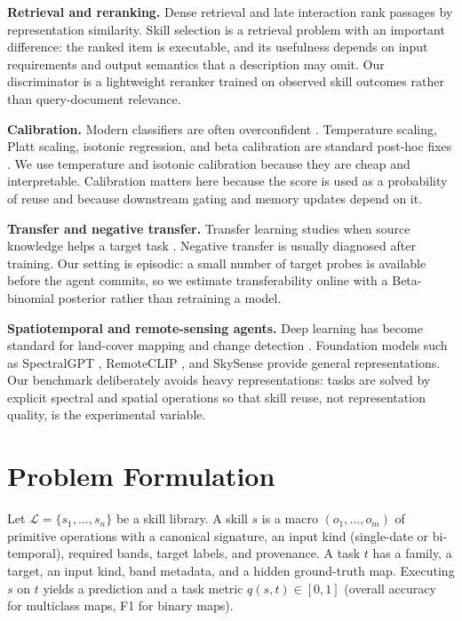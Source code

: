\documentclass[journal]{IEEEtran}
\begin{document}
\textbf{Retrieval and reranking.} Dense retrieval \cite{dpr,rag} and late interaction \cite{colbert} rank passages by representation similarity. Skill selection is a retrieval problem with an important difference: the ranked item is executable, and its usefulness depends on input requirements and output semantics that a description may omit. Our discriminator is a lightweight reranker trained on observed skill outcomes rather than query-document relevance.

\textbf{Calibration.} Modern classifiers are often overconfident \cite{guo}. Temperature scaling, Platt scaling, isotonic regression, and beta calibration are standard post-hoc fixes \cite{platt,zadrozny,niculescu,kull}. We use temperature and isotonic calibration because they are cheap and interpretable. Calibration matters here because the score is used as a probability of reuse and because downstream gating and memory updates depend on it.

\textbf{Transfer and negative transfer.} Transfer learning studies when source knowledge helps a target task \cite{pan,zhuang}. Negative transfer is usually diagnosed after training. Our setting is episodic: a small number of target probes is available before the agent commits, so we estimate transferability online with a Beta-binomial posterior rather than retraining a model.

\textbf{Spatiotemporal and remote-sensing agents.} Deep learning has become standard for land-cover mapping and change detection \cite{zhu,ma,chencd}. Foundation models such as SpectralGPT \cite{spectralgpt}, RemoteCLIP \cite{remoteclip}, and SkySense \cite{skysense} provide general representations. Our benchmark deliberately avoids heavy representations: tasks are solved by explicit spectral and spatial operations so that skill reuse, not representation quality, is the experimental variable.

\section{Problem Formulation}

Let $\mathcal{L}=\{s_1,\dots,s_n\}$ be a skill library. A skill $s$ is a macro $(o_1,\dots,o_m)$ of primitive operations with a canonical signature, an input kind (single-date or bi-temporal), required bands, target labels, and provenance. A task $t$ has a family, a target, an input kind, band metadata, and a hidden ground-truth map. Executing $s$ on $t$ yields a prediction and a task metric $q(s,t)\in[0,1]$ (overall accuracy for multiclass maps, F1 for binary maps).
\end{document}
